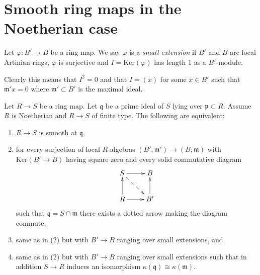 \section{Smooth ring maps in the Noetherian case}
\label{section-smooth-Noetherian}

\begin{definition}
\label{definition-small-extension}
Let $\varphi : B' \to B$ be a ring map.
We say $\varphi$ is a {\it small extension} if
$B'$ and $B$ are local Artinian rings, $\varphi$ is surjective
and $I = \text{Ker}(\varphi)$ has length $1$ as a $B'$-module.
\end{definition}

\noindent
Clearly this means that $I^2 = 0$ and that $I = (x)$ for some
$x \in B'$ such that $\mathfrak m' x = 0$ where $\mathfrak m' \subset B'$
is the maximal ideal.

\begin{lemma}
\label{lemma-smooth-test-artinian}
Let $R \to S$ be a ring map. Let $\mathfrak q$ be a prime ideal of
$S$ lying over $\mathfrak p \subset R$. Assume $R$ is Noetherian
and $R \to S$ of finite type.
The following are equivalent:
\begin{enumerate}
\item $R \to S$ is smooth at $\mathfrak q$,
\item for every surjection of local $R$-algebras
$(B', \mathfrak m') \to (B, \mathfrak m)$
with $\text{Ker}(B' \to B)$ having square zero
and every solid commutative diagram
$$
\xymatrix{
S \ar[r] \ar@{-->}[rd] & B \\
R \ar[r] \ar[u] & B' \ar[u]
}
$$
such that $\mathfrak q = S \cap \mathfrak m$ there exists a dotted
arrow making the diagram commute,
\item same as in (2) but with $B' \to B$ ranging over small extensions, and
\item same as in (2) but with $B' \to B$ ranging over small extensions
such that in addition $S \to R$ induces an isomorphism
$\kappa(\mathfrak q) \cong \kappa(\mathfrak m)$.
\end{enumerate}
\end{lemma}

